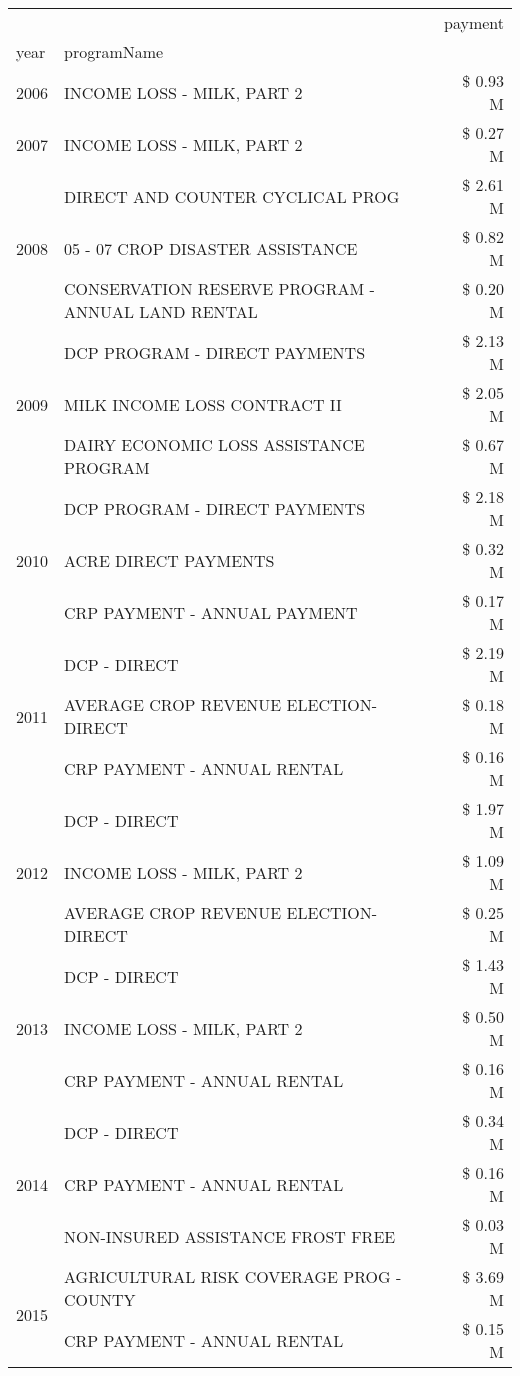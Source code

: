 \begin{tabular}{llr}
\toprule
 &  & payment \\
year & programName &  \\
\midrule
2006 & INCOME LOSS - MILK, PART 2 & \$ 0.93 M \\
\cline{1-3}
2007 & INCOME LOSS - MILK, PART 2 & \$ 0.27 M \\
\cline{1-3}
\multirow[t]{3}{*}{2008} & DIRECT AND COUNTER CYCLICAL PROG & \$ 2.61 M \\
 & 05 - 07 CROP DISASTER ASSISTANCE & \$ 0.82 M \\
 & CONSERVATION RESERVE PROGRAM - ANNUAL LAND RENTAL & \$ 0.20 M \\
\cline{1-3}
\multirow[t]{3}{*}{2009} & DCP PROGRAM - DIRECT PAYMENTS & \$ 2.13 M \\
 & MILK INCOME LOSS CONTRACT II & \$ 2.05 M \\
 & DAIRY ECONOMIC LOSS ASSISTANCE PROGRAM & \$ 0.67 M \\
\cline{1-3}
\multirow[t]{3}{*}{2010} & DCP PROGRAM - DIRECT PAYMENTS & \$ 2.18 M \\
 & ACRE DIRECT PAYMENTS & \$ 0.32 M \\
 & CRP PAYMENT - ANNUAL PAYMENT & \$ 0.17 M \\
\cline{1-3}
\multirow[t]{3}{*}{2011} & DCP - DIRECT & \$ 2.19 M \\
 & AVERAGE CROP REVENUE ELECTION-DIRECT & \$ 0.18 M \\
 & CRP PAYMENT - ANNUAL RENTAL & \$ 0.16 M \\
\cline{1-3}
\multirow[t]{3}{*}{2012} & DCP - DIRECT & \$ 1.97 M \\
 & INCOME LOSS - MILK, PART 2 & \$ 1.09 M \\
 & AVERAGE CROP REVENUE ELECTION-DIRECT & \$ 0.25 M \\
\cline{1-3}
\multirow[t]{3}{*}{2013} & DCP - DIRECT & \$ 1.43 M \\
 & INCOME LOSS - MILK, PART 2 & \$ 0.50 M \\
 & CRP PAYMENT - ANNUAL RENTAL & \$ 0.16 M \\
\cline{1-3}
\multirow[t]{3}{*}{2014} & DCP - DIRECT & \$ 0.34 M \\
 & CRP PAYMENT - ANNUAL RENTAL & \$ 0.16 M \\
 & NON-INSURED ASSISTANCE FROST FREE & \$ 0.03 M \\
\cline{1-3}
\multirow[t]{3}{*}{2015} & AGRICULTURAL RISK COVERAGE PROG - COUNTY & \$ 3.69 M \\
 & CRP PAYMENT - ANNUAL RENTAL & \$ 0.15 M \\

\end{tabular}
